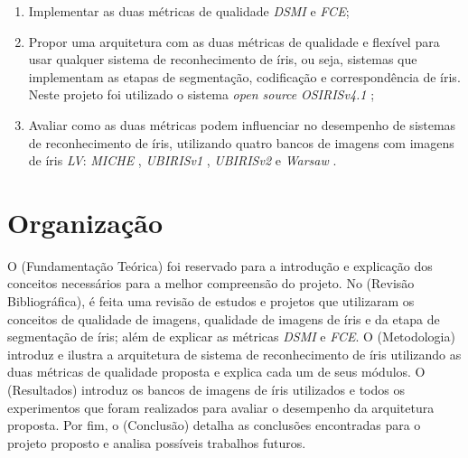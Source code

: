 \begin{enumerate}
    \item Implementar as duas métricas de qualidade \textit{\acrshort{DSMI}} e \textit{\acrshort{FCE}};
    \item Propor uma arquitetura com as duas métricas de qualidade e flexível para usar qualquer sistema de reconhecimento de íris, ou seja, sistemas que implementam as etapas de segmentação, codificação e correspondência de íris. Neste projeto foi utilizado o sistema \textit{open source} \textit{OSIRISv4.1} \cite{othman2015};
    \item Avaliar como as duas métricas podem influenciar no desempenho de sistemas de reconhecimento de íris, utilizando quatro bancos de imagens com imagens de íris \textit{\acrshort{LV}}: \textit{MICHE} \cite{marsico2017-MICHE-1}, \textit{UBIRISv1} \cite{proenca2005-ubirisv1}, \textit{UBIRISv2} \cite{proence2010-ubirisv2} e \textit{\acrfull{Warsaw}} \cite{trokielwicz2016-Warsaw}.
\end{enumerate}


\section{Organização}

\par O  (Fundamentação Teórica) foi reservado para a introdução e explicação dos conceitos necessários para a melhor compreensão do projeto. No  (Revisão Bibliográfica), é feita uma revisão de estudos e projetos que utilizaram os conceitos de qualidade de imagens, qualidade de imagens de íris e da etapa de segmentação de íris; além de explicar as métricas \textit{\acrshort{DSMI}} e \textit{\acrshort{FCE}}. O  (Metodologia) introduz e ilustra a arquitetura de sistema de reconhecimento de íris utilizando as duas métricas de qualidade proposta e explica cada um de seus módulos. O  (Resultados) introduz os bancos de imagens de íris utilizados e todos os experimentos que foram realizados para avaliar o desempenho da arquitetura proposta. Por fim, o  (Conclusão) detalha as conclusões encontradas para o projeto proposto e analisa possíveis trabalhos futuros.